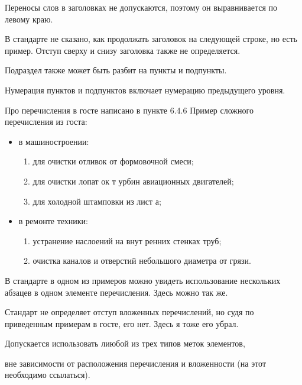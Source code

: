 Переносы слов в заголовках не допускаются, поэтому он выравнивается по левому
краю.

В стандарте не сказано, как продолжать заголовок на следующей строке, но есть
пример. Отступ сверху и снизу заголовка также не определяется.


\parag

Подраздел также может быть разбит на пункты и подпункты.

\parag

Нумерация пунктов и подпунктов включает нумерацию предыдущего уровня.

Про перечисления в госте написано  в пункте 6.4.6 
Пример сложного перечисления из госта:

\begin{itemize}
    \item в машиностроении:
    \begin{enumerate}
        \item для очистки отливок от формовочной смеси;
        \item для очистки лопат ок т урбин авиационных двигателей;
        \item для холодной штамповки из лист а;
    \end{enumerate}
    \item в ремонте техники:
    \begin{enumerate}
        \item устранение наслоений на внут ренних стенках труб;
        \item очистка каналов и отверстий небольшого диаметра от грязи.
    \end{enumerate}
\end{itemize} 

В стандарте в одном из примеров можно увидеть использование нескольких абзацев
в одном элементе перечисления. Здесь можно так же.

Стандарт не определяет отступ вложенных перечислений, но судя по приведенным примерам в госте,
его нет. Здесь я тоже его убрал.

\begin{asblist}
    \item Допускается использовать лиюбой из трех типов меток элементов,
    \item вне зависимости от расположения перечисления и вложенности (на этот необходимо ссылаться).
\end{asblist}
  
